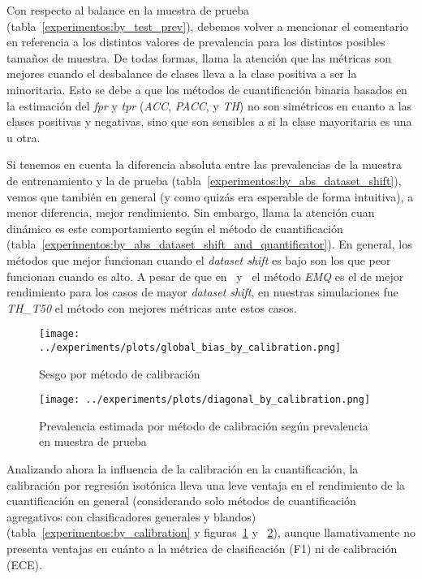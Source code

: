 Con respecto al balance en la muestra de prueba
(tabla~\ref{experimentos:by_test_prev}), debemos volver a mencionar el
comentario en referencia a los distintos valores de prevalencia para los
distintos posibles tamaños de muestra. De todas formas, llama la atención que
las métricas son mejores cuando el desbalance de clases lleva a la clase
positiva a ser la minoritaria. Esto se debe a que los métodos de cuantificación
binaria basados en la estimación del {\it fpr\/} y {\it tpr\/} ({\it ACC}, {\it
PACC}, y {\it TH\/}) no son simétricos en cuanto a las clases positivas y
negativas, sino que son sensibles a si la clase mayoritaria es una u otra.

Si tenemos en cuenta la diferencia absoluta entre las prevalencias de la muestra
de entrenamiento y la de prueba (tabla~\ref{experimentos:by_abs_dataset_shift}),
vemos que también en general (y como quizás era esperable de forma intuitiva), a
menor diferencia, mejor rendimiento. Sin embargo, llama la atención cuan
dinámico es este comportamiento según el método de cuantificación
(tabla~\ref{experimentos:by_abs_dataset_shift_and_quantificator}). En general,
los métodos que mejor funcionan cuando el {\it dataset shift\/} es bajo son los
que peor funcionan cuando es alto. A pesar de que en~\citet{moreo2022tweet}
y~\citet{moreo2021quapy} el método {\it EMQ\/} es el de mejor rendimiento para
los casos de mayor {\it dataset shift}, en nuestras simulaciones fue {\it
TH\_T50\/} el método con mejores métricas ante estos casos.

\begin{figure}[H]
    \centering
    \centerline{\texttt{[image: ../experiments/plots/global\_bias\_by\_calibration.png]}}
    \caption{Sesgo por método de
    calibración}\label{fig:global_bias_by_calibration}
\end{figure}
\begin{figure}[H]
    \centering
    \centerline{\texttt{[image: ../experiments/plots/diagonal\_by\_calibration.png]}}
    \caption{Prevalencia estimada por método de calibración según prevalencia en
    muestra de prueba}\label{fig:diagonal_by_calibration}
\end{figure}

Analizando ahora la influencia de la calibración en la cuantificación, la
calibración por regresión isotónica lleva una leve ventaja en el rendimiento de
la cuantificación en general (considerando solo métodos de cuantificación
agregativos con clasificadores generales y blandos)
(tabla~\ref{experimentos:by_calibration} y
figuras~\ref{fig:global_bias_by_calibration} y
~\ref{fig:diagonal_by_calibration}), aunque llamativamente no presenta ventajas
en cuánto a la métrica de clasificación (F1) ni de calibración (ECE).

